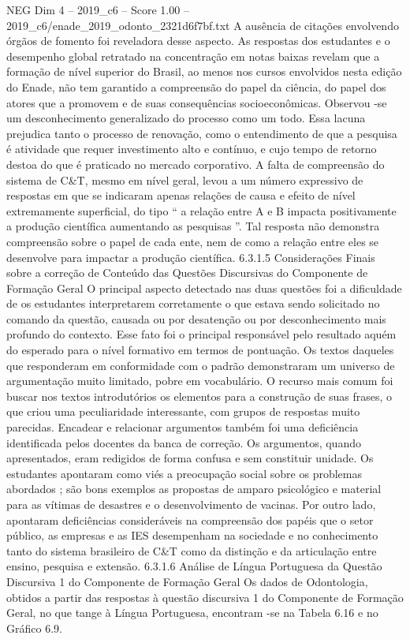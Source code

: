 \begin{textsample}{NEG Dim 4 – 2019\_c6 – Score 1.00 – 2019\_c6/enade\_2019\_odonto\_2321d6f7bf.txt}
A ausência de citações envolvendo órgãos de fomento foi reveladora desse aspecto.
As respostas dos estudantes e o desempenho global retratado na concentração em notas baixas revelam que a formação de nível superior do Brasil, ao menos nos cursos envolvidos nesta edição do Enade, não tem garantido a compreensão do papel da ciência, do papel dos atores que a promovem e de suas consequências socioeconômicas.
Observou -se um desconhecimento generalizado do processo como um todo.
Essa lacuna prejudica tanto o processo de renovação, como o entendimento de que a pesquisa é atividade que requer investimento alto e contínuo, e cujo tempo de retorno destoa do que é praticado no mercado corporativo.
A falta de compreensão do sistema de C\&T, mesmo em nível geral, levou a um número expressivo de respostas em que se indicaram apenas relações de causa e efeito de nível extremamente superficial, do tipo “ a relação entre A e B impacta positivamente a produção científica aumentando as pesquisas ”.
Tal resposta não demonstra compreensão sobre o papel de cada ente, nem de como a relação entre eles se desenvolve para impactar a produção científica. 6.3.1.5 Considerações Finais sobre a correção de Conteúdo das Questões Discursivas do Componente de Formação Geral O principal aspecto detectado nas duas questões foi a dificuldade de os estudantes interpretarem corretamente o que estava sendo solicitado no comando da questão, causada ou por desatenção ou por desconhecimento mais profundo do contexto.
Esse fato foi o principal responsável pelo resultado aquém do esperado para o nível formativo em termos de pontuação.
Os textos daqueles que responderam em conformidade com o padrão demonstraram um universo de argumentação muito limitado, pobre em vocabulário.
O recurso mais comum foi buscar nos textos introdutórios os elementos para a construção de suas frases, o que criou uma peculiaridade interessante, com grupos de respostas muito parecidas.
Encadear e relacionar argumentos também foi uma deficiência identificada pelos docentes da banca de correção.
Os argumentos, quando apresentados, eram redigidos de forma confusa e sem constituir unidade.
Os estudantes apontaram como viés a preocupação social sobre os problemas abordados ; são bons exemplos as propostas de amparo psicológico e material para as vítimas de desastres e o desenvolvimento de vacinas.
Por outro lado, apontaram deficiências consideráveis na compreensão dos papéis que o setor público, as empresas e as IES desempenham na sociedade e no conhecimento tanto do sistema brasileiro de C\&T como da distinção e da articulação entre ensino, pesquisa e extensão. 6.3.1.6 Análise de Língua Portuguesa da Questão Discursiva 1 do Componente de Formação Geral Os dados de Odontologia, obtidos a partir das respostas à questão discursiva 1 do Componente de Formação Geral, no que tange à Língua Portuguesa, encontram -se na Tabela 6.16 e no Gráfico 6.9.

\end{textsample}
